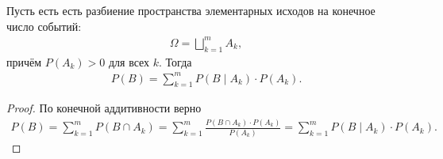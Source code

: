 \documentclass[../main.tex]{subfiles}
\begin{document}
\begin{prop}
 Пусть есть есть разбиение пространства элементарных исходов на конечное число событий:
 \begin{align*}
  \Omega = \bigsqcup_{k=1}^{m} A_k,
 \end{align*} причём $P(A_k) > 0$ для всех $ k $. Тогда
 \begin{align}
  \label{equation:total_probability_formula}
  P(B) = \sum_{k=1}^{m} P(B \mid A_k) \cdot P(A_k)
 .\end{align} 
\end{prop}
\begin{proof} По конечной аддитивности верно
 \begin{align*}
  P(B) = \sum_{k=1}^{m} P(B \cap A_k) = \sum_{k=1}^{m} \frac{P(B \cap A_k) \cdot P(A_k)}{P(A_k)} = \sum_{k=1}^{m} P(B \mid A_k) \cdot P(A_k).
 \end{align*} 
\end{proof}
\end{document}
